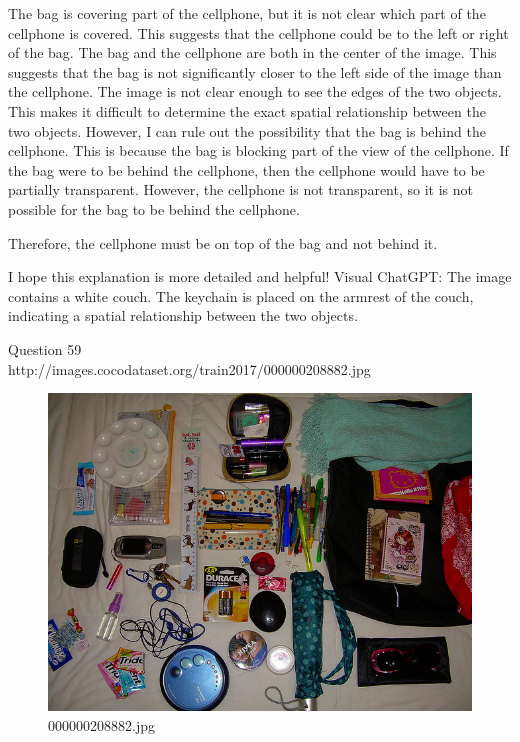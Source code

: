 \begin{enumerate}
    The bag is covering part of the cellphone, but it is not clear which part of the cellphone is covered. This suggests that the cellphone could be to the left or right of the bag.
    The bag and the cellphone are both in the center of the image. This suggests that the bag is not significantly closer to the left side of the image than the cellphone.
    The image is not clear enough to see the edges of the two objects. This makes it difficult to determine the exact spatial relationship between the two objects.
    However, I can rule out the possibility that the bag is behind the cellphone. This is because the bag is blocking part of the view of the cellphone. If the bag were to be behind the cellphone, then the cellphone would have to be partially transparent. However, the cellphone is not transparent, so it is not possible for the bag to be behind the cellphone.
    
    Therefore, the cellphone must be on top of the bag and not behind it.
    
    I hope this explanation is more detailed and helpful!
    \subitem Visual ChatGPT: The image contains a white couch. The keychain is placed on the armrest of the couch, indicating a spatial relationship between the two objects.
\end{enumerate}
Question 59\\
http://images.cocodataset.org/train2017/000000208882.jpg
\begin{figure}[h]
    \centering
    \includegraphics[width=0.8\linewidth]{../image set/hard/000000208882.jpg}
    \caption{000000208882.jpg}
\end{figure}
